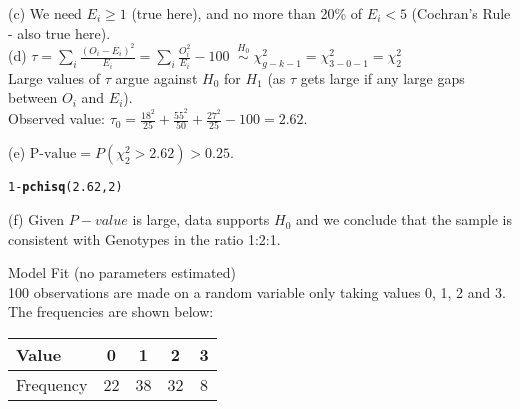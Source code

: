 \documentclass[bigtut]{tutorial}\usepackage[]{graphicx}\usepackage[]{color}
\makeatletter
\newcommand{\hlnum}[1]{\textcolor[rgb]{0.686,0.059,0.569}{#1}}%
\newcommand{\hlopt}[1]{\textcolor[rgb]{0,0,0}{#1}}%
\newcommand{\hlstd}[1]{\textcolor[rgb]{0.345,0.345,0.345}{#1}}%
\newcommand{\hlkwd}[1]{\textcolor[rgb]{0.737,0.353,0.396}{\textbf{#1}}}%
\newenvironment{kframe}{%
 \def\at@end@of@kframe{}%
 \ifinner\ifhmode%
  \def\at@end@of@kframe{\end{minipage}}%
  \begin{minipage}{\columnwidth}%
 \fi\fi%
 \def\FrameCommand##1{\hskip\@totalleftmargin \hskip-\fboxsep
 \colorbox{shadecolor}{##1}\hskip-\fboxsep
     \hskip-\linewidth \hskip-\@totalleftmargin \hskip\columnwidth}%
 \MakeFramed {\advance\hsize-\width
   \@totalleftmargin\z@ \linewidth\hsize
   \@setminipage}}%
 {\par\unskip\endMakeFramed%
 \at@end@of@kframe}
\newenvironment{knitrout}{}{} %
\makeatother
\begin{document}
\begin{tutorial}
\begin{questions}
\begin{solution}
(c)
 We need $E_{i} \geq 1$ (true here), and no more than 20\% of $E_{i} < 5$ (Cochran's Rule - also true here).\\

(d)
 $\tau = \sum_{i}  \frac{  (O_i - E_i)^2  } {  E_i }  =   \sum_{i}  \frac{  O_i^2  } {  E_i }  -100   \; \; 
\overset{H_0}{\sim} \; \chi^2_{g-k-1} = \chi^2_{3-0-1} = \chi^2_{2}$ \\

Large values of $\tau$ argue against $H_{0}$ for $H_{1}$ (as $\tau$ gets large if any large gaps between $O_{i}$ and $E_{i}$). \\

Observed value: $\tau_{0} = 
\frac{18^2}{25} + \frac{55^2}{50} + \frac{27^2}{25} - 100 = 2.62$.

(e)
$\text{P-value} =  P(\chi^2_{2} > 2.62) > 0.25$. \\

\begin{knitrout}
\color{fgcolor}\begin{kframe}
\begin{alltt}
\hlnum{1}\hlopt{-}\hlkwd{pchisq}\hlstd{(}\hlnum{2.62}\hlstd{,}\hlnum{2}\hlstd{)}
\end{alltt}
\end{kframe}
\end{knitrout}


\vspace{.5cm}
(f)
Given $P-value$ is large, data supports $H_{0}$ and we conclude that the sample is consistent with Genotypes in the ratio 1:2:1.
\end{solution}

\vspace{.5cm}
\question Model Fit (no parameters estimated) \\

100 observations are made on a random variable only taking values 0,
1, 2 and 3. The frequencies are shown below:
\begin{center}
\begin{tabular}[ ]{|l||c|c|c|c|}\hline
Value & 0 & 1 & 2 & 3\\\hline Frequency & 22 & 38 & 32 & 8\\\hline
\end{tabular}
\end{center}


\end{questions}
\end{tutorial}
\end{document}
